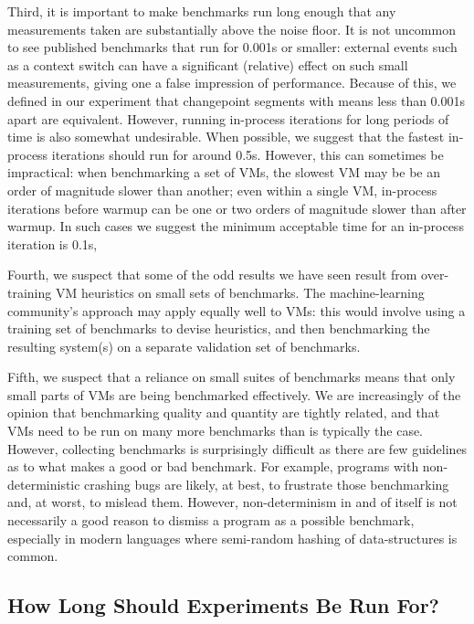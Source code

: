 \documentclass[acmsmall]{acmart}\settopmatter{printfolios=true}
\begin{document}
Third, it is important to make benchmarks run long enough that any measurements
taken are substantially above the noise floor. It is not uncommon to see
published benchmarks that run for 0.001s or smaller: external events such as a context switch
can have a significant (relative) effect on such small measurements,
giving one a false impression of performance. Because of this,
we defined in our experiment that changepoint segments with means less than 0.001s
apart are equivalent. However, running in-process iterations for long periods
of time is also somewhat undesirable. When possible, we suggest that
the fastest in-process iterations should run for around 0.5s. However, this can
sometimes be impractical: when benchmarking a set of VMs, the slowest VM may be
be an order of magnitude slower than another; even within a single VM,
in-process iterations before warmup can be one or two orders of magnitude slower
than after warmup. In such cases we suggest the minimum acceptable time for an
in-process iteration is 0.1s,

Fourth, we suspect that some of the odd results we have seen result from
over-training VM heuristics on small sets of benchmarks. The machine-learning
community's approach may apply equally well to VMs: this would involve
using a training set of benchmarks to devise heuristics, and then benchmarking
the resulting system(s) on a separate validation set of benchmarks.

Fifth, we suspect that a reliance on small suites of benchmarks means that
only small parts of VMs are being benchmarked effectively. We are increasingly
of the opinion that benchmarking quality and quantity are tightly related, and
that VMs need to be run on many more benchmarks than is typically the case.
However, collecting benchmarks is surprisingly difficult as there are few
guidelines as to what makes a good or bad benchmark. For example, programs with
non-deterministic crashing bugs are likely, at best, to frustrate those benchmarking and,
at worst, to mislead them. However, non-determinism in and of itself is not
necessarily a good reason to dismiss a program as a possible benchmark,
especially in modern languages where semi-random hashing of data-structures is
common.


\subsection{How Long Should Experiments Be Run For?}
\label{how long}
\end{document}
